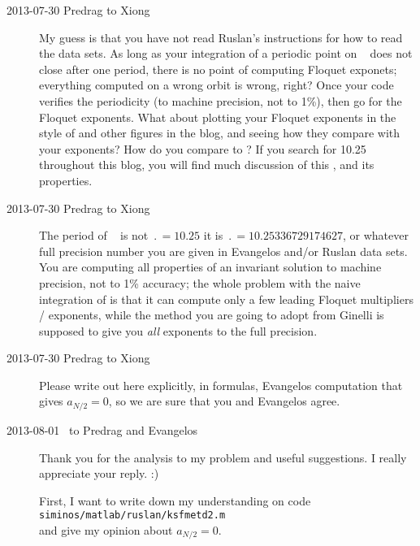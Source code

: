 \begin{description}
\item[2013-07-30 Predrag to Xiong] My guess is that you have not read
    Ruslan's instructions for how to read the data sets. As long as
    your integration of a periodic point on \po\  does not
    close after one period, there is no point of computing Floquet
    exponets; everything computed on a wrong orbit is wrong, right?
    Once your code verifies the periodicity (to machine precision, not
    to 1\%), then go for the Floquet exponents. What about plotting
    your Floquet exponents in the style of  and
    other figures in the blog, and seeing how they compare with your
    exponents? How do you compare to ?
    If you search for 10.25 throughout this blog, you will find much
    discussion of this \po, and its properties.

\item[2013-07-30 Predrag to Xiong] The period of \po\
     is not $\period{}=10.25$ it is
    $\period{}=10.25336729174627$, or whatever full precision number
    you are given in Evangelos and/or Ruslan data sets. You are
    computing all properties of an invariant solution to machine
    precision, not to 1\% accuracy; the whole problem with the naive
    integration of \refeq{XD-JacobianEq} is that it can compute only a
    few leading Floquet multipliers / exponents, while the method you
    are going to adopt from Ginelli \etal\rf{GiChLiPo12} is supposed to
    give you {\em all} exponents to the full precision.

\item[2013-07-30 Predrag to Xiong] Please write out here explicitly, in
    formulas, Evangelos computation that gives $a_{N/2}=0$, so we are
    sure that you and Evangelos agree.

\item[2013-08-01 \XD\ to Predrag and Evangelos] Thank you for the analysis to my
problem and useful suggestions. I really appreciate your reply. :)

First, I want to write down my understanding on code \\
\texttt{siminos/matlab/ruslan/ksfmetd2.m} \\
and give my opinion about $a_{N/2}=0$.


\end{description}
